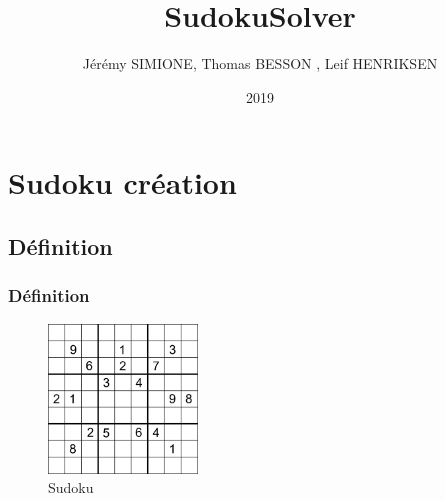 \documentclass{beamer}
\title{SudokuSolver}
\author{Jérémy SIMIONE, Thomas BESSON , Leif HENRIKSEN}
\institute{Université de Montpellier}
\date{2019}
\begin{document}
\begin{frame}
  \titlepage
\end{frame}


\section{Sudoku création}
\subsection{Définition}
\begin{frame}
\frametitle{Définition}

\begin{figure}
        \centering
        \includegraphics[width=150]{img/sud.png}
        \caption{Sudoku}
        \label{fig:my_label}
    \end{figure}
    
\end{frame}
\end{document}
